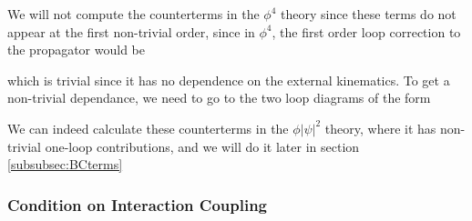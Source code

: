 \documentclass[11pt]{article}
\numberwithin{equation}{section}
\begin{document}
We will not compute the counterterms in the \(\phi^4\) theory since these terms do not appear at the first non-trivial order, since in \(\phi^4\), the first order loop correction to the propagator would be 
\begin{figure}[H]
    \centering
\end{figure}
which is trivial since it has no dependence on the external kinematics. To get a non-trivial dependance, we need to go to the two loop diagrams of the form 
\begin{figure}[H]
    \centering
\end{figure}

We can indeed calculate these counterterms in the \(\phi|\psi|^2\) theory, where it has non-trivial one-loop contributions, and we will do it later in section \ref{subsubsec:BCterms}

\subsubsection{Condition on Interaction Coupling}
\end{document}
